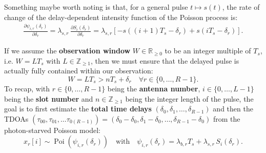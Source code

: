 \noindent
Something maybe worth noting is that, for a general pulse \(t\mapsto s(t)\), the rate of change of the delay-dependent intensity function of the Poisson process is:
\begin{equation}
\begin{aligned}
\frac{\partial \psi_{i,r}(\delta_r)}{\partial \delta_r}
= \lambda_{s,r}\,\frac{\partial S_i(\delta_r)}{\partial \delta_r}
= \lambda_{s,r}
\left[-s\left((i+1)T_s-\delta_r\right)+s\left(iT_s-\delta_r\right)\right].
\end{aligned}
\label{eq:thederivative}
\end{equation}

\noindent
If we assume the \textbf{observation window} \(W\in\mathbb{R}_{\geq0}\) to be an integer multiple of \(T_s\), i.e. \(W=LT_s\) with \(L\in \mathbb{Z}_{\geq1}\), then we must ensure that the delayed pulse is actually fully contained within our observation:
\begin{equation}
W=LT_s>nT_s+\delta_r \quad \forall  r\in\{0,\ldots,R-1\}.
\label{eq:thecondition}
\end{equation}
To recap, with \(r\in\{0,\ldots,R-1\}\) being the \textbf{antenna number}, \(i\in\{0,\ldots,L-1\}\) being the \textbf{slot number} and \(n \in \mathbb{Z}_{\geq1}\) being the integer length of the pulse, the goal is to first estimate the \textbf{total time delays} \((\delta_0,\delta_1,\ldots,\delta_{R-1})\) and then the TDOAs \((\tau_{00},\tau_{01},\ldots\tau_{0(R-1)})=(\delta_0-\delta_0,\delta_1-\delta_0,\ldots,\delta_{R-1}-\delta_0)\) from the photon-starved Poisson model:
\begin{equation}
x_r[i]\sim \operatorname{Poi}\left(\psi_{i,r}(\delta_r)\right)
\quad
\text{with}
\quad
\psi_{i,r}(\delta_r)=\lambda_{b,r} T_s+\lambda_{s,r}\, S_i\left(\delta_r\right).
\end{equation}

